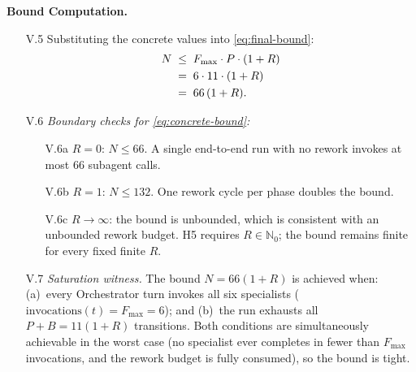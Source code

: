 \documentclass[12pt]{article}
\theoremstyle{definition}
\begin{document}
\medskip
\noindent\textbf{Bound Computation.}
\begin{enumerate}
    \item[V.5] Substituting the concrete values into
               \eqref{eq:final-bound}:
               \begin{align}
                   N
                   &\;\leq\; F_{\max} \cdot P \cdot (1 + R)
                   \notag\\
                   &\;=\; 6 \cdot 11 \cdot (1 + R)
                   \notag\\
                   &\;=\; 66\,(1 + R).
                   \label{eq:concrete-bound}
               \end{align}

    \item[V.6] \emph{Boundary checks for \eqref{eq:concrete-bound}:}
               \begin{enumerate}
                   \item[V.6a] $R = 0$: $N \leq 66$.  A single
                               end-to-end run with no rework invokes
                               at most $66$ subagent calls. \checkmark
                   \item[V.6b] $R = 1$: $N \leq 132$.  One rework
                               cycle per phase doubles the bound. \checkmark
                   \item[V.6c] $R \to \infty$: the bound is unbounded,
                               which is consistent with an unbounded
                               rework budget.  H5 requires $R \in
                               \mathbb{N}_{0}$; the bound remains
                               finite for every fixed finite $R$.
                               \checkmark
               \end{enumerate}

    \item[V.7] \emph{Saturation witness.}  The bound
               $N = 66(1+R)$ is achieved when:
               (a)~every Orchestrator turn invokes all six specialists
               ($\text{invocations}(t) = F_{\max} = 6$); and
               (b)~the run exhausts all $P + B = 11(1+R)$ transitions.
               Both conditions are simultaneously achievable in the
               worst case (no specialist ever completes in fewer than
               $F_{\max}$ invocations, and the rework budget is
               fully consumed), so the bound is tight. \checkmark
\end{enumerate}
\end{document}
